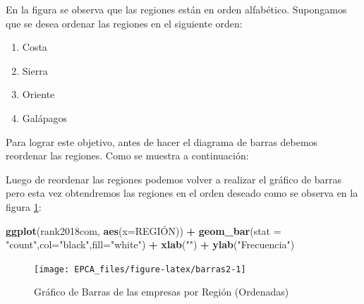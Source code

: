 \documentclass[
]{krantz}
\makeatletter
\newenvironment{Shaded}{\begin{snugshade}}{\end{snugshade}}
\newcommand{\DataTypeTok}[1]{\textcolor[rgb]{0.27,0.27,0.27}{#1}}
\newcommand{\KeywordTok}[1]{\textcolor[rgb]{0.27,0.27,0.27}{\textbf{#1}}}
\newcommand{\NormalTok}[1]{#1}
\newcommand{\OperatorTok}[1]{\textcolor[rgb]{0.43,0.43,0.43}{\textbf{#1}}}
\newcommand{\StringTok}[1]{\textcolor[rgb]{0.5,0.5,0.5}{#1}}
\providecommand{\tightlist}{%
  \setlength{\itemsep}{0pt}\setlength{\parskip}{0pt}}
\newenvironment{kframe}{%
\medskip{}
\setlength{\fboxsep}{.8em}
 \def\at@end@of@kframe{}%
 \ifinner\ifhmode%
  \def\at@end@of@kframe{\end{minipage}}%
  \begin{minipage}{\columnwidth}%
 \fi\fi%
 \def\FrameCommand##1{\hskip\@totalleftmargin \hskip-\fboxsep
 \colorbox{shadecolor}{##1}\hskip-\fboxsep
     \hskip-\linewidth \hskip-\@totalleftmargin \hskip\columnwidth}%
 \MakeFramed {\advance\hsize-\width
   \@totalleftmargin\z@ \linewidth\hsize
   \@setminipage}}%
 {\par\unskip\endMakeFramed%
 \at@end@of@kframe}
\renewenvironment{Shaded}{\begin{kframe}}{\end{kframe}}
\makeatother
\begin{document}
En la figura se observa que las regiones están en orden alfabético. Supongamos que se desea ordenar las regiones en el siguiente orden:

\begin{enumerate}
\def\labelenumi{\arabic{enumi}.}
\tightlist
\item
  Costa
\item
  Sierra
\item
  Oriente
\item
  Galápagos
\end{enumerate}

Para lograr este objetivo, antes de hacer el diagrama de barras debemos reordenar las regiones. Como se muestra a continuación:

\begin{Shaded}
\end{Shaded}

Luego de reordenar las regiones podemos volver a realizar el gráfico de barras pero esta vez obtendremos las regiones en el orden deseado como se observa en la figura \ref{fig:barras2}:

\begin{Shaded}
\begin{Highlighting}[]
\KeywordTok{ggplot}\NormalTok{(rank2018com, }\KeywordTok{aes}\NormalTok{(}\DataTypeTok{x=}\NormalTok{REGIÓN)) }\OperatorTok{+}\StringTok{ }
\StringTok{  }\KeywordTok{geom_bar}\NormalTok{(}\DataTypeTok{stat =} \StringTok{"count"}\NormalTok{,}\DataTypeTok{col=}\StringTok{"black"}\NormalTok{,}\DataTypeTok{fill=}\StringTok{"white"}\NormalTok{) }\OperatorTok{+}
\StringTok{  }\KeywordTok{xlab}\NormalTok{(}\StringTok{""}\NormalTok{) }\OperatorTok{+}\StringTok{ }\KeywordTok{ylab}\NormalTok{(}\StringTok{"Frecuencia"}\NormalTok{)}
\end{Highlighting}
\end{Shaded}

\begin{figure}[h!]

{\centering \texttt{[image: EPCA\_files/figure-latex/barras2-1]} 

}

\caption{Gráfico de Barras de las empresas por Región (Ordenadas)}\label{fig:barras2}
\end{figure}
\end{document}
